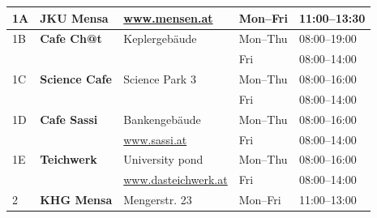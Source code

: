 \begin{center}
\begin{footnotesize}
 \begin{longtable}{|| l || l | l | l l||} 
 \hline
 \hline  
  1A & \textbf{JKU Mensa}  & \url{www.mensen.at}  & Mon--Fri & 11:00--13:30  \\ \hline
  1B & \textbf{Cafe Ch@t} & Keplergeb\"{a}ude &  Mon--Thu & 08:00--19:00 \\
     &                    &                         &  Fri & 08:00--14:00 \\ \hline
  1C & \textbf{Science Cafe} & Science Park 3 &  Mon--Thu & 08:00--16:00 \\ 
     &                    &                         &  Fri & 08:00--14:00 \\ \hline
  1D & \textbf{Cafe Sassi} & Bankengeb\"{a}ude &  Mon--Thu & 08:00--16:00 \\
     &                    &  \url{www.sassi.at}  &  Fri & 08:00--14:00 \\ \hline
  1E & \textbf{Teichwerk} & University pond &  Mon--Thu & 08:00--16:00 \\
     &                    & \url{www.dasteichwerk.at}  &  Fri & 08:00--14:00 \\ \hline
  2  & \textbf{KHG Mensa} & Mengerstr. 23 & Mon--Fri & 11:00--13:00  \\ 
  

\end{longtable}
\end{footnotesize}
\end{center}
